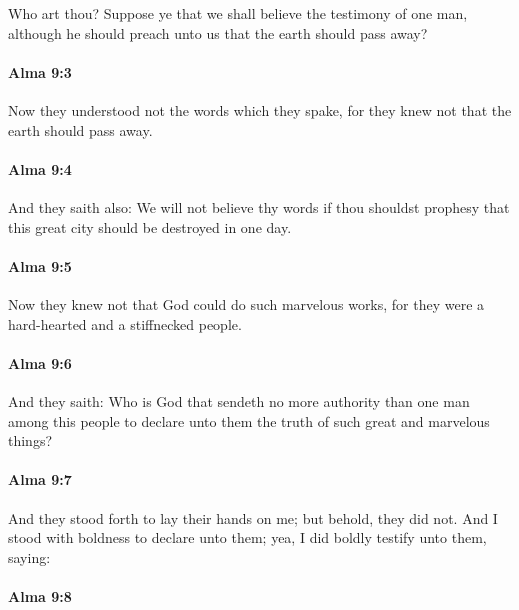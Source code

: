 			Who art thou?
			Suppose ye that we shall believe the testimony of one man,
			although he should preach unto us that the earth should pass away?

		\paragraph{Alma 9:3} %
			\label{ALMA-9-3}

			Now they understood not the words which they spake,
			for they knew not that the earth should pass away.

		\paragraph{Alma 9:4} %
			\label{ALMA-9-4}

			And they saith also:
			We will not believe thy words
			if thou shouldst prophesy that this great city should be destroyed in one day.

		\paragraph{Alma 9:5} %
			\label{ALMA-9-5}

			Now they knew not that God could do such marvelous works,
			for they were a hard-hearted and a stiffnecked people.
			
		\paragraph{Alma 9:6} %
			\label{ALMA-9-6}

			And they saith:
			Who is God that sendeth no more authority than one man among this people
			to declare unto them the truth of such great and marvelous things?

		\paragraph{Alma 9:7} %
			\label{ALMA-9-7}

			And they stood forth to lay their hands on me;
			but behold, they did not.
			And I stood with boldness to declare unto them;
			yea, I did boldly testify unto them, saying:

		\paragraph{Alma 9:8} %
			\label{ALMA-9-8}

